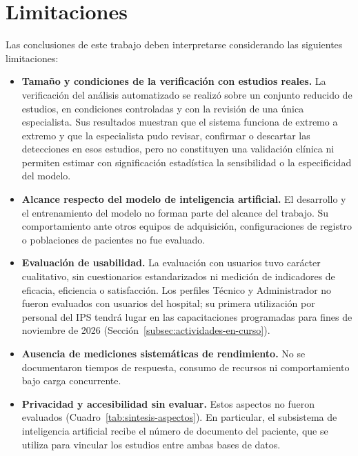 \section{Limitaciones}
\label{sec:limitaciones}

Las conclusiones de este trabajo deben interpretarse considerando las siguientes limitaciones:

\begin{itemize}
    \item \textbf{Tamaño y condiciones de la verificación con estudios reales.}
    La verificación del análisis automatizado se realizó sobre un conjunto reducido de estudios, en condiciones controladas y con la revisión de una única especialista.
    Sus resultados muestran que el sistema funciona de extremo a extremo y que la especialista pudo revisar, confirmar o descartar las detecciones en esos estudios, pero no constituyen una validación clínica ni permiten estimar con significación estadística la sensibilidad o la especificidad del modelo.

    \item \textbf{Alcance respecto del modelo de inteligencia artificial.}
    El desarrollo y el entrenamiento del modelo no forman parte del alcance del trabajo.
    Su comportamiento ante otros equipos de adquisición, configuraciones de registro o poblaciones de pacientes no fue evaluado.

    \item \textbf{Evaluación de usabilidad.}
    La evaluación con usuarios tuvo carácter cualitativo, sin cuestionarios estandarizados ni medición de indicadores de eficacia, eficiencia o satisfacción.
    Los perfiles Técnico y Administrador no fueron evaluados con usuarios del hospital; su primera utilización por personal del IPS tendrá lugar en las capacitaciones programadas para fines de noviembre de 2026 (Sección~\ref{subsec:actividades-en-curso}).

    \item \textbf{Ausencia de mediciones sistemáticas de rendimiento.}
    No se documentaron tiempos de respuesta, consumo de recursos ni comportamiento bajo carga concurrente.

    \item \textbf{Privacidad y accesibilidad sin evaluar.}
    Estos aspectos no fueron evaluados (Cuadro~\ref{tab:sintesis-aspectos}).
    En particular, el subsistema de inteligencia artificial recibe el número de documento del paciente, que se utiliza para vincular los estudios entre ambas bases de datos.


\end{itemize}
